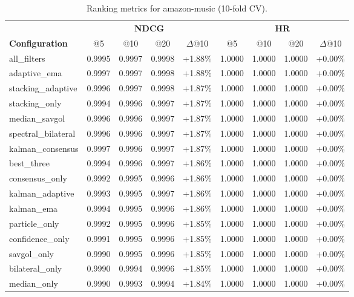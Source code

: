 \begin{table}[htbp]
\centering
\caption{Ranking metrics for amazon-music (10-fold CV).}
\label{tab:ranking-amazon-music}
\begin{adjustbox}{max width=\textwidth}
\begin{tabular}{l cccc cccc}
\toprule
& \multicolumn{4}{c}{\textbf{NDCG}} & \multicolumn{4}{c}{\textbf{HR}} \\
\cmidrule(lr){2-5} \cmidrule(lr){6-9}
\textbf{Configuration} & @5 & @10 & @20 & $\Delta$@10 & @5 & @10 & @20 & $\Delta$@10 \\
\midrule
all\_filters & 0.9995 & 0.9997 & 0.9998 & +1.88\% & 1.0000 & 1.0000 & 1.0000 & +0.00\% \\
adaptive\_ema & 0.9997 & 0.9997 & 0.9998 & +1.88\% & 1.0000 & 1.0000 & 1.0000 & +0.00\% \\
stacking\_adaptive & 0.9996 & 0.9997 & 0.9998 & +1.87\% & 1.0000 & 1.0000 & 1.0000 & +0.00\% \\
stacking\_only & 0.9994 & 0.9996 & 0.9997 & +1.87\% & 1.0000 & 1.0000 & 1.0000 & +0.00\% \\
median\_savgol & 0.9996 & 0.9996 & 0.9997 & +1.87\% & 1.0000 & 1.0000 & 1.0000 & +0.00\% \\
spectral\_bilateral & 0.9996 & 0.9996 & 0.9997 & +1.87\% & 1.0000 & 1.0000 & 1.0000 & +0.00\% \\
kalman\_consensus & 0.9997 & 0.9996 & 0.9997 & +1.87\% & 1.0000 & 1.0000 & 1.0000 & +0.00\% \\
best\_three & 0.9994 & 0.9996 & 0.9997 & +1.86\% & 1.0000 & 1.0000 & 1.0000 & +0.00\% \\
consensus\_only & 0.9992 & 0.9995 & 0.9996 & +1.86\% & 1.0000 & 1.0000 & 1.0000 & +0.00\% \\
kalman\_adaptive & 0.9993 & 0.9995 & 0.9997 & +1.86\% & 1.0000 & 1.0000 & 1.0000 & +0.00\% \\
kalman\_ema & 0.9994 & 0.9995 & 0.9996 & +1.86\% & 1.0000 & 1.0000 & 1.0000 & +0.00\% \\
particle\_only & 0.9992 & 0.9995 & 0.9996 & +1.85\% & 1.0000 & 1.0000 & 1.0000 & +0.00\% \\
confidence\_only & 0.9991 & 0.9995 & 0.9996 & +1.85\% & 1.0000 & 1.0000 & 1.0000 & +0.00\% \\
savgol\_only & 0.9990 & 0.9995 & 0.9996 & +1.85\% & 1.0000 & 1.0000 & 1.0000 & +0.00\% \\
bilateral\_only & 0.9990 & 0.9994 & 0.9996 & +1.85\% & 1.0000 & 1.0000 & 1.0000 & +0.00\% \\
median\_only & 0.9990 & 0.9993 & 0.9994 & +1.84\% & 1.0000 & 1.0000 & 1.0000 & +0.00\% \\

\end{tabular}
\end{adjustbox}
\end{table}
